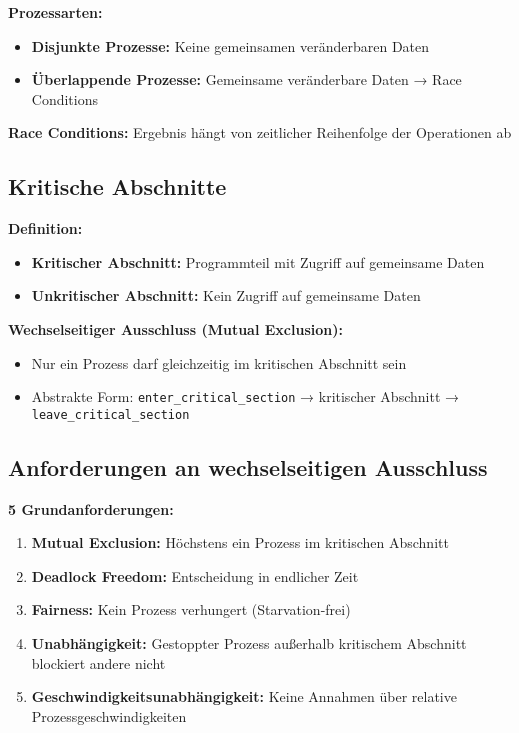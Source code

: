 \documentclass[9pt,a4paper]{extarticle}
\begin{document}
\begin{multicols*}{2}
\textbf{Prozessarten:}
\begin{itemize}
\item \textbf{Disjunkte Prozesse:} Keine gemeinsamen veränderbaren Daten
\item \textbf{Überlappende Prozesse:} Gemeinsame veränderbare Daten → Race Conditions
\end{itemize}

\textbf{Race Conditions:} Ergebnis hängt von zeitlicher Reihenfolge der Operationen ab

\subsection{Kritische Abschnitte}
\textbf{Definition:}
\begin{itemize}
\item \textbf{Kritischer Abschnitt:} Programmteil mit Zugriff auf gemeinsame Daten
\item \textbf{Unkritischer Abschnitt:} Kein Zugriff auf gemeinsame Daten
\end{itemize}

\textbf{Wechselseitiger Ausschluss (Mutual Exclusion):}
\begin{itemize}
\item Nur ein Prozess darf gleichzeitig im kritischen Abschnitt sein
\item Abstrakte Form: \texttt{enter\_critical\_section} → kritischer Abschnitt → \texttt{leave\_critical\_section}
\end{itemize}

\subsection{Anforderungen an wechselseitigen Ausschluss}
\textbf{5 Grundanforderungen:}
\begin{enumerate}
\item \textbf{Mutual Exclusion:} Höchstens ein Prozess im kritischen Abschnitt
\item \textbf{Deadlock Freedom:} Entscheidung in endlicher Zeit
\item \textbf{Fairness:} Kein Prozess verhungert (Starvation-frei)
\item \textbf{Unabhängigkeit:} Gestoppter Prozess außerhalb kritischem Abschnitt blockiert andere nicht
\item \textbf{Geschwindigkeitsunabhängigkeit:} Keine Annahmen über relative Prozessgeschwindigkeiten
\end{enumerate}


\end{multicols*}
\end{document}
